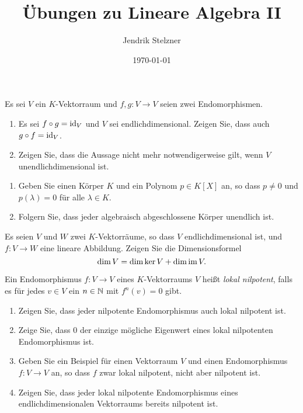 \documentclass[a4paper,10pt]{scrartcl}
\title{Übungen zu Lineare Algebra II}
\author{Jendrik Stelzner}
\date{\today}
\begin{document}
\maketitle
















\begin{question}
  Es sei $V$ ein $K$-Vektorraum und $f, g \colon V \to V$ seien zwei Endomorphismen.
  \begin{enumerate}[leftmargin=*]
    \item
      Es sei $f \circ g = \operatorname{id}_V$ und $V$ sei endlichdimensional.
      Zeigen Sie, dass auch $g \circ f = \operatorname{id}_V$.
    \item
      Zeigen Sie, dass die Aussage nicht mehr notwendigerweise gilt, wenn $V$ unendlichdimensional ist.
  \end{enumerate}
\end{question}


\begin{question}
  \begin{enumerate}[leftmargin=*]
    \item
      Geben Sie einen Körper $K$ und ein Polynom $p \in K[X]$ an, so dass $p \neq 0$ und $p(\lambda) = 0$ für alle $\lambda \in K$.
    \item
      Folgern Sie, dass jeder algebraisch abgeschlossene Körper unendlich ist.
  \end{enumerate}
\end{question}


\begin{question}
  Es seien $V$ und $W$ zwei $K$-Vektorräume, so dass $V$ endlichdimensional ist, und $f \colon V \to W$ eine lineare Abbildung.
  Zeigen Sie die Dimensionsformel
  \[
    \dim V = \dim \ker V + \dim \operatorname{im} V.
  \]
\end{question}


\begin{question}
  Ein Endomorphismus $f \colon V \to V$ eines $K$-Vektorraums $V$ heißt \emph{lokal nilpotent}, falls es für jedes $v \in V$ ein $n \in \mathbb{N}$ mit $f^n(v) = 0$ gibt.
  \begin{enumerate}[leftmargin=*]
    \item
      Zeigen Sie, dass jeder nilpotente Endomorphismus auch lokal nilpotent ist.
    \item
      Zeige Sie, dass $0$ der einzige mögliche Eigenwert eines lokal nilpotenten Endomorphismus ist.
    \item
      Geben Sie ein Beispiel für einen Vektorraum $V$ und einen Endomorphismus $f \colon V \to V$ an, so dass $f$ zwar lokal nilpotent, nicht aber nilpotent ist.
    \item
      Zeigen Sie, dass jeder lokal nilpotente Endomorphismus eines endlichdimensionalen Vektorraums bereits nilpotent ist.
  \end{enumerate}
\end{question}
\end{document}
